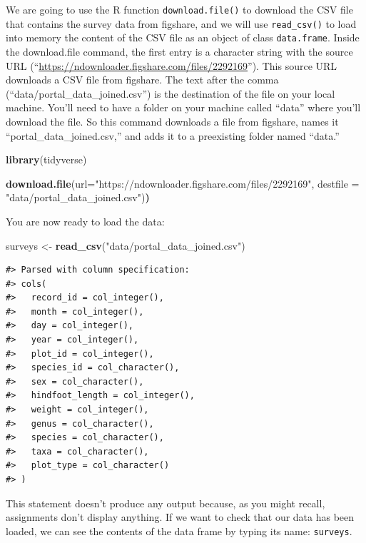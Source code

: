 \documentclass[]{book}
\newenvironment{Shaded}{\begin{snugshade}}{\end{snugshade}}
\newcommand{\KeywordTok}[1]{\textcolor[rgb]{0.13,0.29,0.53}{\textbf{#1}}}
\newcommand{\DataTypeTok}[1]{\textcolor[rgb]{0.13,0.29,0.53}{#1}}
\newcommand{\StringTok}[1]{\textcolor[rgb]{0.31,0.60,0.02}{#1}}
\newcommand{\ErrorTok}[1]{\textcolor[rgb]{0.64,0.00,0.00}{\textbf{#1}}}
\newcommand{\NormalTok}[1]{#1}
\begin{document}
We are going to use the R function \texttt{download.file()} to download
the CSV file that contains the survey data from figshare, and we will
use \texttt{read\_csv()} to load into memory the content of the CSV file
as an object of class \texttt{data.frame}. Inside the download.file
command, the first entry is a character string with the source URL
(``\url{https://ndownloader.figshare.com/files/2292169}''). This source
URL downloads a CSV file from figshare. The text after the comma
(``data/portal\_data\_joined.csv'') is the destination of the file on
your local machine. You'll need to have a folder on your machine called
``data'' where you'll download the file. So this command downloads a
file from figshare, names it ``portal\_data\_joined.csv,'' and adds it
to a preexisting folder named ``data.''

\begin{Shaded}
\begin{Highlighting}[]
\KeywordTok{library}\NormalTok{(tidyverse)}

\KeywordTok{download.file}\NormalTok{(}\DataTypeTok{url=}\StringTok{"https://ndownloader.figshare.com/files/2292169"}\NormalTok{,}
              \DataTypeTok{destfile =} \StringTok{"data/portal_data_joined.csv"}\NormalTok{)}\ErrorTok{)}
\end{Highlighting}
\end{Shaded}

You are now ready to load the data:

\begin{Shaded}
\begin{Highlighting}[]
\NormalTok{surveys <-}\StringTok{ }\KeywordTok{read_csv}\NormalTok{(}\StringTok{"data/portal_data_joined.csv"}\NormalTok{)}
\end{Highlighting}
\end{Shaded}

\begin{verbatim}
#> Parsed with column specification:
#> cols(
#>   record_id = col_integer(),
#>   month = col_integer(),
#>   day = col_integer(),
#>   year = col_integer(),
#>   plot_id = col_integer(),
#>   species_id = col_character(),
#>   sex = col_character(),
#>   hindfoot_length = col_integer(),
#>   weight = col_integer(),
#>   genus = col_character(),
#>   species = col_character(),
#>   taxa = col_character(),
#>   plot_type = col_character()
#> )
\end{verbatim}

This statement doesn't produce any output because, as you might recall,
assignments don't display anything. If we want to check that our data
has been loaded, we can see the contents of the data frame by typing its
name: \texttt{surveys}.
\end{document}
